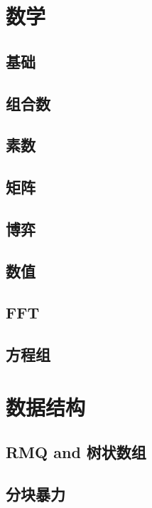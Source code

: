 \documentclass{article}
\begin{document}


\tableofcontents

\newpage

\section{数学}
\subsection{基础}

\subsection{组合数}

\subsection{素数}

\subsection{矩阵}

\subsection{博弈}

\subsection{数值}

\subsection{FFT}

\subsection{方程组}

\section{数据结构}
\subsection{RMQ and 树状数组}

\subsection{分块暴力}

\end{document}
